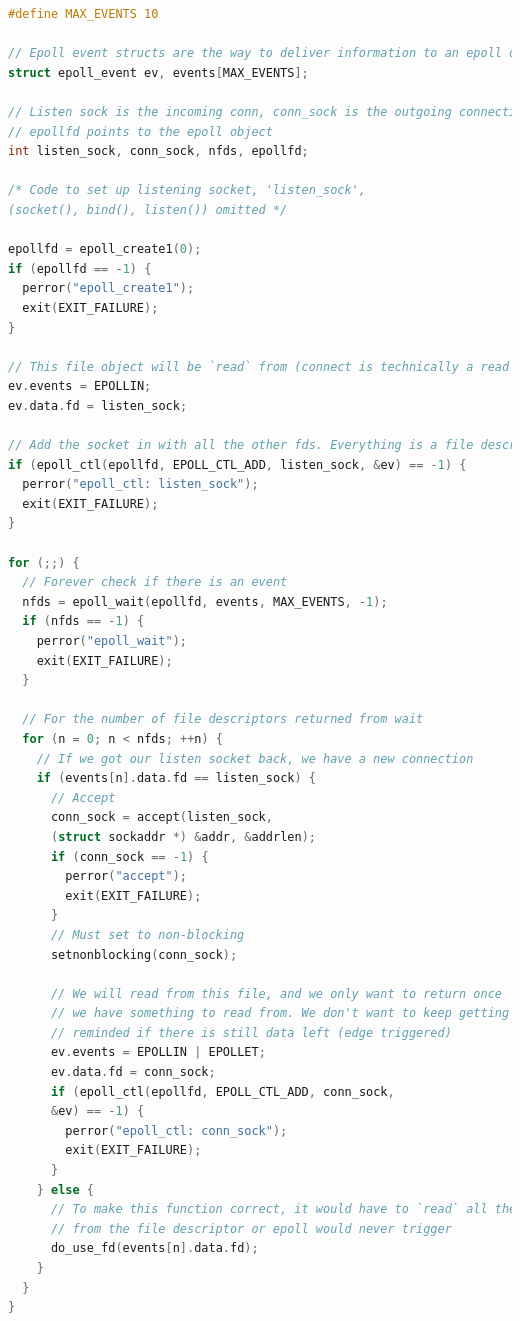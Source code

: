 \begin{lstlisting}[language=C]
#define MAX_EVENTS 10

// Epoll event structs are the way to deliver information to an epoll device
struct epoll_event ev, events[MAX_EVENTS];

// Listen sock is the incoming conn, conn_sock is the outgoing connection, nfds is number of file des
// epollfd points to the epoll object
int listen_sock, conn_sock, nfds, epollfd;

/* Code to set up listening socket, 'listen_sock',
(socket(), bind(), listen()) omitted */

epollfd = epoll_create1(0);
if (epollfd == -1) {
  perror("epoll_create1");
  exit(EXIT_FAILURE);
}

// This file object will be `read` from (connect is technically a read operation)
ev.events = EPOLLIN;
ev.data.fd = listen_sock;

// Add the socket in with all the other fds. Everything is a file descriptor
if (epoll_ctl(epollfd, EPOLL_CTL_ADD, listen_sock, &ev) == -1) {
  perror("epoll_ctl: listen_sock");
  exit(EXIT_FAILURE);
}

for (;;) {
  // Forever check if there is an event
  nfds = epoll_wait(epollfd, events, MAX_EVENTS, -1);
  if (nfds == -1) {
    perror("epoll_wait");
    exit(EXIT_FAILURE);
  }

  // For the number of file descriptors returned from wait
  for (n = 0; n < nfds; ++n) {
    // If we got our listen socket back, we have a new connection
    if (events[n].data.fd == listen_sock) {
      // Accept
      conn_sock = accept(listen_sock,
      (struct sockaddr *) &addr, &addrlen);
      if (conn_sock == -1) {
        perror("accept");
        exit(EXIT_FAILURE);
      }
      // Must set to non-blocking
      setnonblocking(conn_sock);

      // We will read from this file, and we only want to return once
      // we have something to read from. We don't want to keep getting
      // reminded if there is still data left (edge triggered)
      ev.events = EPOLLIN | EPOLLET;
      ev.data.fd = conn_sock;
      if (epoll_ctl(epollfd, EPOLL_CTL_ADD, conn_sock,
      &ev) == -1) {
        perror("epoll_ctl: conn_sock");
        exit(EXIT_FAILURE);
      }
    } else {
      // To make this function correct, it would have to `read` all the data
      // from the file descriptor or epoll would never trigger
      do_use_fd(events[n].data.fd);
    }
  }
}

\end{lstlisting}

